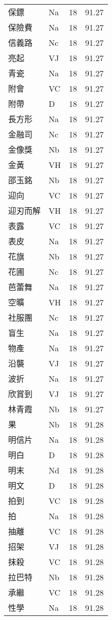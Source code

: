 \documentclass[twocolumn]{book}
\begin{document}
\begin{supertabular}{llrr}
保鏢 & Na & 18 &  91.27\\
保險費 & Na & 18 &  91.27\\
信義路 & Nc & 18 &  91.27\\
亮起 & VJ & 18 &  91.27\\
青瓷 & Na & 18 &  91.27\\
附會 & VC & 18 &  91.27\\
附帶 & D & 18 &  91.27\\
長方形 & Na & 18 &  91.27\\
金融司 & Nc & 18 &  91.27\\
金像獎 & Nb & 18 &  91.27\\
金黃 & VH & 18 &  91.27\\
邵玉銘 & Nb & 18 &  91.27\\
迎向 & VC & 18 &  91.27\\
迎刃而解 & VH & 18 &  91.27\\
表露 & VC & 18 &  91.27\\
表皮 & Na & 18 &  91.27\\
花旗 & Nb & 18 &  91.27\\
花圃 & Nc & 18 &  91.27\\
芭蕾舞 & Na & 18 &  91.27\\
空曠 & VH & 18 &  91.27\\
社服團 & Nc & 18 &  91.27\\
盲生 & Na & 18 &  91.27\\
物產 & Na & 18 &  91.27\\
沿襲 & VJ & 18 &  91.27\\
波折 & Na & 18 &  91.27\\
欣賞到 & VJ & 18 &  91.27\\
林青霞 & Nb & 18 &  91.27\\
果 & Nb & 18 &  91.28\\
明信片 & Na & 18 &  91.28\\
明白 & D & 18 &  91.28\\
明末 & Nd & 18 &  91.28\\
明文 & D & 18 &  91.28\\
拍到 & VC & 18 &  91.28\\
拍 & Na & 18 &  91.28\\
抽離 & VC & 18 &  91.28\\
招架 & VJ & 18 &  91.28\\
抹殺 & VC & 18 &  91.28\\
拉巴特 & Nb & 18 &  91.28\\
承繼 & VC & 18 &  91.28\\
性學 & Na & 18 &  91.28\\

\end{supertabular}
\end{document}
